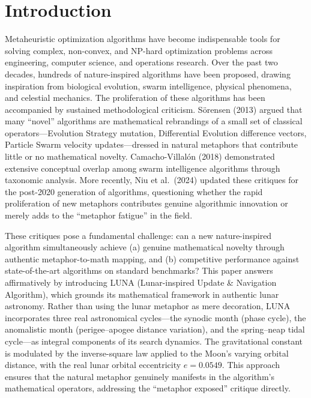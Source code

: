 \documentclass[11pt,a4paper]{article}
\begin{document}
\tableofcontents
\newpage

\section{Introduction}

Metaheuristic optimization algorithms have become indispensable tools for solving complex, non-convex, and NP-hard optimization problems across engineering, computer science, and operations research. Over the past two decades, hundreds of nature-inspired algorithms have been proposed, drawing inspiration from biological evolution, swarm intelligence, physical phenomena, and celestial mechanics. The proliferation of these algorithms has been accompanied by sustained methodological criticism. S\"orensen (2013) argued that many ``novel'' algorithms are mathematical rebrandings of a small set of classical operators---Evolution Strategy mutation, Differential Evolution difference vectors, Particle Swarm velocity updates---dressed in natural metaphors that contribute little or no mathematical novelty. Camacho-Villal\'on (2018) demonstrated extensive conceptual overlap among swarm intelligence algorithms through taxonomic analysis. More recently, Niu et al.\ (2024) updated these critiques for the post-2020 generation of algorithms, questioning whether the rapid proliferation of new metaphors contributes genuine algorithmic innovation or merely adds to the ``metaphor fatigue'' in the field.

These critiques pose a fundamental challenge: can a new nature-inspired algorithm simultaneously achieve (a) genuine mathematical novelty through authentic metaphor-to-math mapping, and (b) competitive performance against state-of-the-art algorithms on standard benchmarks? This paper answers affirmatively by introducing LUNA (Lunar-inspired Update \& Navigation Algorithm), which grounds its mathematical framework in authentic lunar astronomy. Rather than using the lunar metaphor as mere decoration, LUNA incorporates three real astronomical cycles---the synodic month (phase cycle), the anomalistic month (perigee--apogee distance variation), and the spring--neap tidal cycle---as integral components of its search dynamics. The gravitational constant is modulated by the inverse-square law applied to the Moon's varying orbital distance, with the real lunar orbital eccentricity $e=0.0549$. This approach ensures that the natural metaphor genuinely manifests in the algorithm's mathematical operators, addressing the ``metaphor exposed'' critique directly.
\end{document}
